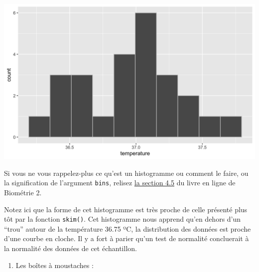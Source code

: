 \documentclass[a4paperpaper,]{article}
\newenvironment{Shaded}{\begin{snugshade}}{\end{snugshade}}
\newcommand{\DataTypeTok}[1]{\textcolor[rgb]{0.00,0.34,0.68}{#1}}
\newcommand{\DecValTok}[1]{\textcolor[rgb]{0.69,0.50,0.00}{#1}}
\newcommand{\FloatTok}[1]{\textcolor[rgb]{0.69,0.50,0.00}{#1}}
\newcommand{\KeywordTok}[1]{\textcolor[rgb]{0.12,0.11,0.11}{\textbf{#1}}}
\newcommand{\NormalTok}[1]{\textcolor[rgb]{0.12,0.11,0.11}{#1}}
\newcommand{\OperatorTok}[1]{\textcolor[rgb]{0.12,0.11,0.11}{#1}}
\newcommand{\OtherTok}[1]{\textcolor[rgb]{0.00,0.43,0.16}{#1}}
\newcommand{\StringTok}[1]{\textcolor[rgb]{0.75,0.01,0.01}{#1}}
\providecommand{\tightlist}{%
  \setlength{\itemsep}{0pt}\setlength{\parskip}{0pt}}
\begin{document}
\begin{Shaded}
\end{Shaded}

\begin{center}\includegraphics[width=0.9\linewidth]{figure/unnamed-chunk-18-1} \end{center}

Si vous ne vous rappelez-plus ce qu'est un histogramme ou comment le faire, ou la signification de l'argument \texttt{bins}, relisez \href{https://besibo.github.io/DA/viz.html\#histogram}{la section 4.5} du livre en ligne de Biométrie 2.

Notez ici que la forme de cet histogramme est très proche de celle présenté plus tôt par la fonction \texttt{skim()}. Cet histogramme nous apprend qu'en dehors d'un ``trou'' autour de la température 36.75 ºC, la distribution des données est proche d'une courbe en cloche. Il y a fort à parier qu'un test de normalité concluerait à la normalité des données de cet échantillon.

\begin{enumerate}
\def\labelenumi{\arabic{enumi}.}
\setcounter{enumi}{2}
\tightlist
\item
  Les boîtes à moustaches :
\end{enumerate}

\begin{Shaded}
\end{Shaded}
\end{document}
